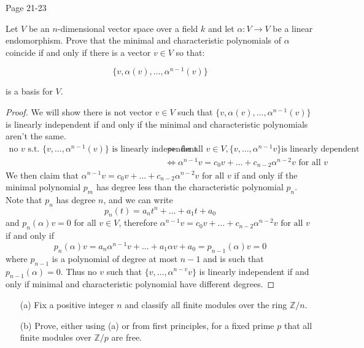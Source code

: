 Page 21-23


\begin{prob}[F2018-Q1]
    Let \( V \) be an \( n \)-dimensional vector space over a field \( k \) and let \( \alpha: V \to V \) be a linear endomorphism.  
Prove that the minimal and characteristic polynomials of \( \alpha \) coincide if and only if there is a vector \( v \in V \) so that:  

\[\{v, \alpha(v), \ldots, \alpha^{n-1}(v)\}\]

is a basis for \( V \).
\end{prob}
\begin{proof}
    We will show there is not vector $v\in V$ such that $\{v, \alpha(v), \ldots, \alpha^{n-1}(v)\}$ is linearly independent if and only if the minimal and characteristic polynomials aren't the same. 
    \begin{align*}
        \text{no $v$ s.t. $\{v,\dots, \alpha^{n-1}(v)\}$ is linearly independent}&\iff \text{ for all } v\in V, \{v,\ldots, \alpha^{n-1}v\} \text{is linearly dependent}\\
        &\iff \alpha^{n-1}v=c_0v+\dots+c_{n-2}\alpha^{n-2}v \text{ for all } v
    \end{align*}
    We then claim that $\alpha^{n-1}v=c_0v+\dots+c_{n-2}\alpha^{n-2}v \text{ for all } v$ if and only if the minimal polynomial $p_m$ has degree less than the characteristic polynomial $p_n$. Note that $p_n$ has degree $n$, and we can write 
    \begin{equation*}
        p_n(t)=a_nt^n+\dots+a_1t+a_0
    \end{equation*}
    and $p_n(\alpha)v=0$ for all $v\in V$, therefore $\alpha^{n-1}v=c_0v+\dots+c_{n-2}\alpha^{n-2}v \text{ for all } v$ if and only if 
    \begin{equation*}
        p_n(\alpha)v=a_n\alpha^{n-1}v+\dots+a_1\alpha v+a_0=p_{n-1}(\alpha)v=0
    \end{equation*}
    where $p_{n-1}$ is a polynomial of degree at most $n-1$ and is such that $p_{n-1}(\alpha)=0$. Thus no $v$ such that $\{v,\dots,\alpha^{n-v}v\}$ is linearly independent if and only if minimal and characteristic polynomial have different degrees.
\end{proof}


\begin{prob}[F2018-Q3]
    \phantom{text}
    \begin{itemize}
        \item[(a)] Fix a positive integer \( n \) and classify all finite modules over the ring \( \mathbb{Z}/n \).
        \item[(b)] Prove, either using (a) or from first principles, for a fixed prime \( p \) that all finite modules over \( \mathbb{Z}/p \) are free.
    \end{itemize}
\end{prob}


